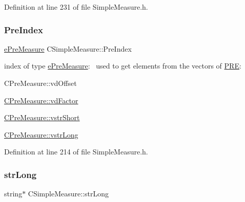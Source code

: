 Definition at line 231 of file Simple\+Measure.\+h.

\mbox{\label{classCSimpleMeasure_aa23ed9eec21adb9a97c90a424e7ee18a}} 
\subsubsection{\texorpdfstring{Pre\+Index}{PreIndex}}
{\footnotesize\ttfamily \hyperlink{PreMeasure_8h_a6c81167b8d4c2badde42f81cb7214620}{e\+Pre\+Measure} C\+Simple\+Measure\+::\+Pre\+Index\hspace{0.3cm}{\ttfamily [protected]}}



index of type \hyperlink{PreMeasure_8h_a6c81167b8d4c2badde42f81cb7214620}{e\+Pre\+Measure}\+:~\newline
 used to get elements from the vectors of \hyperlink{PreMeasure_8h_a349316092037fdd0773335fab4e15ee8}{P\+RE}\+: 


\begin{DoxyItemize}
\item C\+Pre\+Measure\+::vd\+Offset
\item \hyperlink{classCVectorHandle_af8f8b2e0da8363e695872ca85f33364e}{C\+Pre\+Measure\+::vd\+Factor}
\item \hyperlink{classCVectorHandle_afb50c8a33d4cf70bf92c644dca409ea2}{C\+Pre\+Measure\+::vstr\+Short}
\item \hyperlink{classCVectorHandle_a71bec0e385b9ca8e5ffa174b559da9f8}{C\+Pre\+Measure\+::vstr\+Long} 
\end{DoxyItemize}

Definition at line 214 of file Simple\+Measure.\+h.

\mbox{\label{classCSimpleMeasure_a5761fb46fb35ce577066ef1e7ec1ab2e}} 
\subsubsection{\texorpdfstring{str\+Long}{strLong}}
{\footnotesize\ttfamily string$\ast$ C\+Simple\+Measure\+::str\+Long\hspace{0.3cm}{\ttfamily [protected]}}



